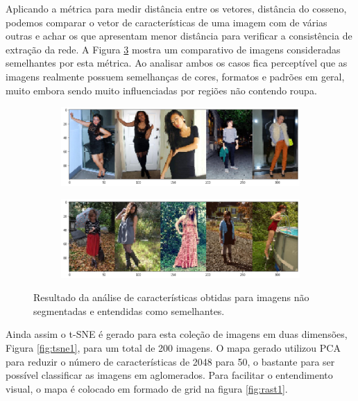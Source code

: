 \documentclass[12pt]{report}
\begin{document}
Aplicando a métrica para medir distância entre os vetores, distância do cosseno, podemos comparar o vetor de características de uma imagem com de várias outras e achar os que apresentam menor distância para verificar a consistência de extração da rede. A Figura \ref{fig:compaoriginais} mostra um comparativo de imagens consideradas semelhantes por esta métrica. Ao analisar ambos os casos fica perceptível que as imagens realmente possuem semelhanças de cores, formatos e padrões em geral, muito embora sendo muito influenciadas por regiões não contendo roupa. 

\begin{figure}
  \centering
  \begin{subfigure}[b]{\textwidth}
  \centering
    \includegraphics[scale=0.45]{images/resultados/compaoriginais2.png}
    \label{fig:}
  \end{subfigure}
  \centering
  \begin{subfigure}[b]{\textwidth}
  \centering
    \includegraphics[scale=0.45]{images/resultados/compaoriginais3.png}
    \label{fig:}
  \end{subfigure}
  \caption{Resultado da análise de características obtidas para imagens não segmentadas e entendidas como semelhantes.}
  \label{fig:compaoriginais}
\end{figure}

Ainda assim o t-SNE é gerado para esta coleção de imagens em duas dimensões, Figura \ref{fig:tsne1}, para um total de 200 imagens. O mapa gerado utilizou PCA para reduzir o número de características de 2048 para 50, o bastante para ser possível classificar as imagens em aglomerados. Para facilitar o entendimento visual, o mapa é colocado em formado de grid na figura \ref{fig:rast1}.
\end{document}
